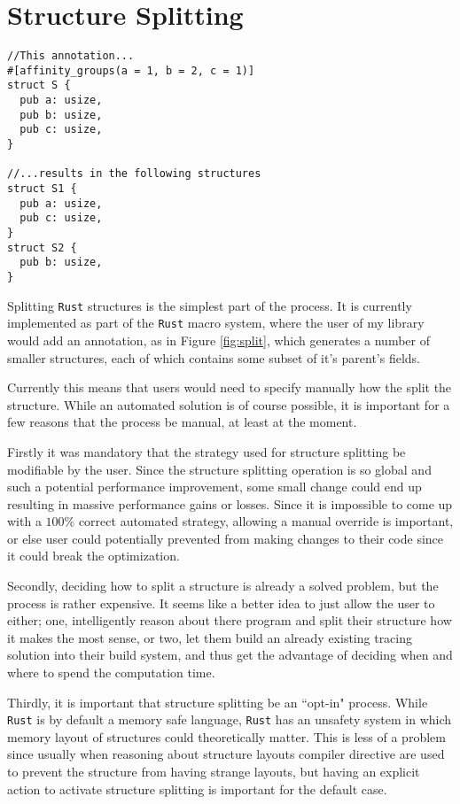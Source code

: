 \documentclass[12pt,oneside]{book}
\newcommand{\rustname}{{\texttt{Rust}}}
\def \rust {\rustname{}\xspace}
\begin{document}

\section{Structure Splitting}

\begin{figure*}
\begin{verbatim}
//This annotation...
#[affinity_groups(a = 1, b = 2, c = 1)]
struct S {
  pub a: usize,
  pub b: usize,
  pub c: usize,
}

//...results in the following structures
struct S1 {
  pub a: usize,
  pub c: usize,
}
struct S2 {
  pub b: usize,
}
\end{verbatim}
  \caption{Structure Splitting as a macro}
  \label{fig:split}
\end{figure*}
Splitting \rust structures is the simplest part of the process. It is currently
implemented as part of the \rust macro system, where the user of my library
would add an annotation, as in Figure \ref{fig:split}, which generates a number
of smaller structures, each of which contains some subset of it's parent's fields.

Currently this means
that users would need to specify manually how the split the structure. While an
automated solution is of course possible, it is important for a few reasons that
the process be manual, at least at the moment. 

Firstly it was mandatory that the strategy used for structure splitting be modifiable by the user.
Since the structure splitting operation is so global and such a potential performance improvement,
some small change could end up resulting in massive performance gains or losses. Since it is impossible
to come up with a $100\%$ correct automated strategy, allowing a manual override is important, or else
user could potentially prevented from making changes to their code
since it could break the optimization.

Secondly, deciding how to split a structure is already a solved problem,
but the process is rather expensive. It seems like a better idea to just allow the user to either; one, 
intelligently reason about there program and split their structure how it makes the most sense, or two, 
let them build an already existing tracing solution into their build system, and thus get the advantage
of deciding when and where to spend the computation time.

Thirdly, it is important that structure splitting be an ``opt-in" process.
While \rust is by default a memory safe language, \rust has an
unsafety system in which memory layout of structures could theoretically matter.
This is less of a problem since usually when reasoning about structure layouts
compiler directive are used to prevent the structure from having strange
layouts, but having an explicit action to activate structure
splitting is important for the default case. 
\end{document}
